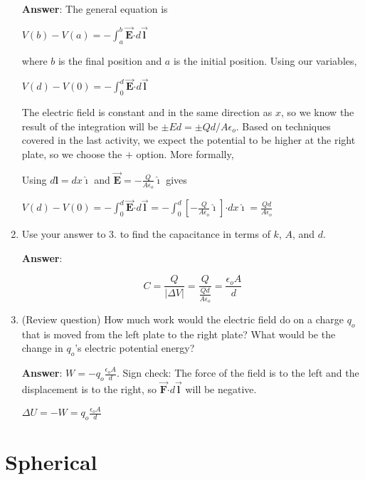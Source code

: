 \documentclass{article}
\newcommand{\ds}[0]{\displaystyle}
\newcommand{\ihat}[0]{\hat{\boldsymbol{\imath}}}
\newcommand{\bfvec}[1]{\vec{\mathbf{#1}}}
\newcommand{\bfcdot}[0]{\boldsymbol{\cdot}}
\begin{document}
\begin{enumerate}
     \ifsolutions
       {\bf Answer}: The general equation is

       $\ds V(b)-V(a) = -\int_a^b\bfvec{E}\bfcdot d\bfvec{l}$

       where $b$ is the final position and $a$ is the initial position. Using our variables,

       $\ds V(d)-V(0) = -\int_0^d\bfvec{E}\bfcdot d\bfvec{l}$

       The electric field is constant and in the same direction as $x$, so we know the result of the integration will be $\pm Ed=\pm Qd/A\epsilon_o$. Based on techniques covered in the last activity, we expect the potential to be higher at the right plate, so we choose the $+$ option. More formally,

       Using $d\mathbf{l}=dx\ihat$  and $\bfvec{E}=-\frac{Q}{A\epsilon_o}\ihat$ gives

       $\ds V(d)-V(0) = -\int_0^d\bfvec{E}\bfcdot d\bfvec{l}=-\int_0^d\left[-\frac{Q}{A\epsilon_o}\ihat\right]\bfcdot dx\ihat=\frac{Qd}{A\epsilon_o}$
     \else
       \vskip 36pt
     \fi
     \ifsolutions\else
     \vskip 36pt
     \fi

  \item Use your answer to 3. to find the capacitance in terms of $k$, $A$, and $d$.

     \ifsolutions
       {\bf Answer}:

       \begin{equation}
     C = \frac{Q}{|\Delta V|} = \frac{Q}{\frac{Qd}{A\epsilon_o}}=\frac{\epsilon_oA}{d}
     \end{equation}
     \else
       \vskip 36pt
     \fi
     \ifsolutions\else
     \vskip 36pt
     \fi

  \item (Review question) How much work would the electric field do on a charge $q_o$ that is moved from the left plate to the right plate? What would be the change in $q_o$'s electric potential energy?

     \ifsolutions
       {\bf Answer}: $\ds W=-q_o\frac{\epsilon_oA}{d}$. Sign check: The force of the field is to the left and the displacement is to the right, so $\bfvec{F}\bfcdot d\bfvec{l}$ will be negative.

       $\ds\Delta U=-W=q_o\frac{\epsilon_oA}{d}$
     \else
       \vskip 36pt
     \fi
     \ifsolutions\else
     \vskip 36pt
     \fi

\end{enumerate}

\section{Spherical}
\end{document}
